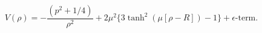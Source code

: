 \begin{equation}\label{Pot}V(\rho)=-\frac{(p^2+1/4)}{\rho^2}+2\mu^2\{3\tanh^2(\mu[\rho-R])-1\}
+\epsilon\mbox{-term}.\end{equation} 
